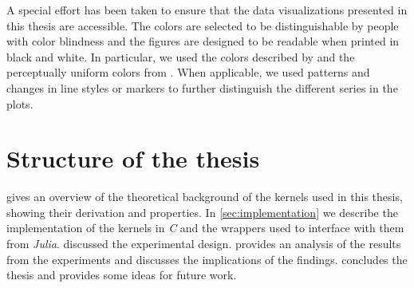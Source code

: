 A special effort has been taken to ensure that the data visualizations
presented in this thesis are accessible. The colors are selected to be
distinguishable by people with color blindness and the figures are designed to
be readable when printed in black and white. In particular,
we used the colors described by \textcite{wongPointsViewColor2011} and
the perceptually uniform colors from \textcite{crameriScientificColourMaps2023}.
When applicable, we used patterns and changes in line styles or markers to
further distinguish the different series in the plots.


\section{Structure of the thesis}

 gives an overview of the theoretical
background of the kernels used in this thesis, showing their derivation and
properties. In \cref{sec:implementation} we describe the implementation of the
kernels in \emph{C} and the wrappers used to interface with them from
\emph{Julia}.  discussed the experimental design.
 provides an analysis of the results from the experiments
and discusses the implications of the findings.
 concludes the thesis and provides some ideas for future
work.




